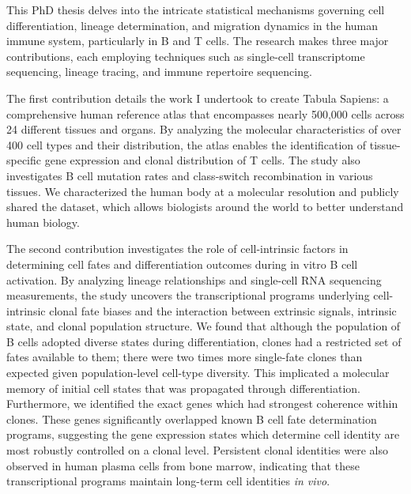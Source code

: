 This PhD thesis delves into the intricate statistical mechanisms governing cell differentiation, lineage determination, and migration dynamics in the human immune system, particularly in B and T cells. The research makes three major contributions, each employing techniques such as single-cell transcriptome sequencing, lineage tracing, and immune repertoire sequencing.

The first contribution details the work I undertook to create Tabula Sapiens: a comprehensive human reference atlas that encompasses nearly 500,000 cells across 24 different tissues and organs. By analyzing the molecular characteristics of over 400 cell types and their distribution, the atlas enables the identification of tissue-specific gene expression and clonal distribution of T cells. The study also investigates B cell mutation rates and class-switch recombination in various tissues. We characterized the human body at a molecular resolution and publicly shared the dataset, which allows biologists around the world to better understand human biology. 

The second contribution investigates the role of cell-intrinsic factors in determining cell fates and differentiation outcomes during in vitro B cell activation. By analyzing lineage relationships and single-cell RNA sequencing measurements, the study uncovers the transcriptional programs underlying cell-intrinsic clonal fate biases and the interaction between extrinsic signals, intrinsic state, and clonal population structure. We found that although the population of B cells adopted diverse states during differentiation, clones had a restricted set of fates available to them; there were two times more single-fate clones than expected given population-level cell-type diversity. This implicated a molecular memory of initial cell states that was propagated through differentiation. Furthermore, we identified the exact genes which had strongest coherence within clones. These genes significantly overlapped known B cell fate determination programs, suggesting the gene expression states which determine cell identity are most robustly controlled on a clonal level. Persistent clonal identities were also observed in human plasma cells from bone marrow, indicating that these transcriptional programs maintain long-term cell identities \textit{in vivo}.

